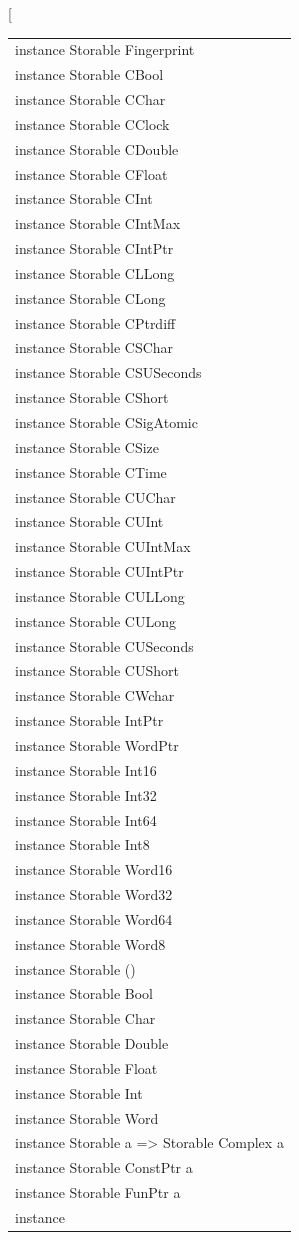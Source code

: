 \begin{haddockdesc}
\item[\begin{tabular}{@{}l}
instance Storable Fingerprint\\instance Storable CBool\\instance Storable CChar\\instance Storable CClock\\instance Storable CDouble\\instance Storable CFloat\\instance Storable CInt\\instance Storable CIntMax\\instance Storable CIntPtr\\instance Storable CLLong\\instance Storable CLong\\instance Storable CPtrdiff\\instance Storable CSChar\\instance Storable CSUSeconds\\instance Storable CShort\\instance Storable CSigAtomic\\instance Storable CSize\\instance Storable CTime\\instance Storable CUChar\\instance Storable CUInt\\instance Storable CUIntMax\\instance Storable CUIntPtr\\instance Storable CULLong\\instance Storable CULong\\instance Storable CUSeconds\\instance Storable CUShort\\instance Storable CWchar\\instance Storable IntPtr\\instance Storable WordPtr\\instance Storable Int16\\instance Storable Int32\\instance Storable Int64\\instance Storable Int8\\instance Storable Word16\\instance Storable Word32\\instance Storable Word64\\instance Storable Word8\\instance Storable ()\\instance Storable Bool\\instance Storable Char\\instance Storable Double\\instance Storable Float\\instance Storable Int\\instance Storable Word\\instance Storable a => Storable Complex a\\instance Storable ConstPtr a\\instance Storable FunPtr a\\instance 
\end{tabular}
\end{haddockdesc}
